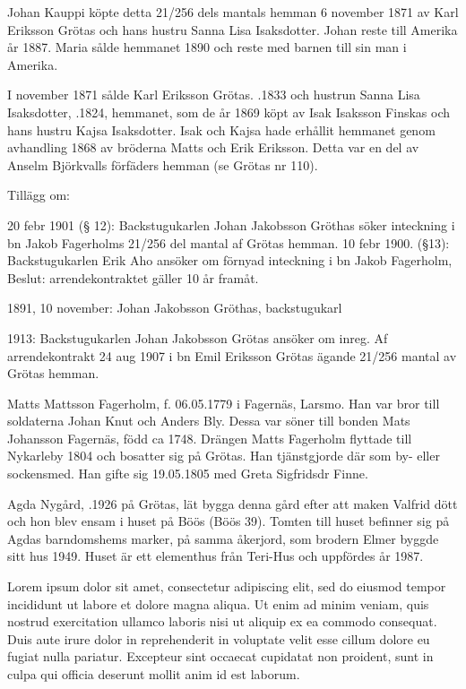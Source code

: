 Johan Kauppi köpte detta 21/256 dels mantals hemman 6 november 1871 av Karl Eriksson Grötas och hans hustru Sanna Lisa Isaksdotter. Johan reste till Amerika år 1887. Maria sålde hemmanet 1890 och reste med barnen till sin man i Amerika.


I november 1871 sålde Karl Eriksson Grötas. .1833 och hustrun Sanna Lisa Isaksdotter, .1824, hemmanet, som de år 1869 köpt av Isak Isaksson Finskas och hans hustru Kajsa Isaksdotter. Isak och Kajsa hade erhållit hemmanet genom avhandling 1868 av bröderna Matts och Erik Eriksson. Detta var en del av Anselm Björkvalls förfäders hemman (se Grötas nr 110).



Tillägg om:

20 febr 1901 (§ 12): Backstugukarlen Johan Jakobsson Gröthas söker inteckning i bn Jakob Fagerholms 21/256 del mantal af Grötas hemman. 10 febr 1900. (§13): Backstugukarlen Erik Aho ansöker om förnyad inteckning i bn Jakob Fagerholm, Beslut: arrendekontraktet gäller 10 år framåt.

1891, 10 november: Johan Jakobsson Gröthas, backstugukarl

1913: Backstugukarlen Johan Jakobsson Grötas ansöker om inreg. Af arrendekontrakt 24 aug 1907 i bn Emil Eriksson Grötas ägande 21/256 mantal av Grötas hemman.

Matts Mattsson Fagerholm, f. 06.05.1779 i Fagernäs, Larsmo. Han var bror till soldaterna Johan Knut och Anders Bly. Dessa var söner till bonden Mats Johansson Fagernäs, född ca 1748.
Drängen Matts Fagerholm flyttade till Nykarleby 1804 och bosatter sig på Grötas. Han tjänstgjorde där som by- eller sockensmed. Han gifte sig 19.05.1805 med Greta Sigfridsdr Finne.






Agda Nygård, .1926 på Grötas, lät bygga denna gård efter att maken Valfrid dött och hon blev ensam i huset på Böös (Böös 39). Tomten till huset befinner sig på Agdas barndomshems marker, på samma åkerjord, som brodern Elmer byggde sitt hus 1949. Huset är ett elementhus från Teri-Hus och uppfördes år 1987.

Lorem ipsum dolor sit amet, consectetur adipiscing elit, sed do eiusmod tempor incididunt ut labore et dolore magna aliqua. Ut enim ad minim veniam, quis nostrud exercitation ullamco laboris nisi ut aliquip ex ea commodo consequat. Duis aute irure dolor in reprehenderit in voluptate velit esse cillum dolore eu fugiat nulla pariatur. Excepteur sint occaecat cupidatat non proident, sunt in culpa qui officia deserunt mollit anim id est laborum. %


